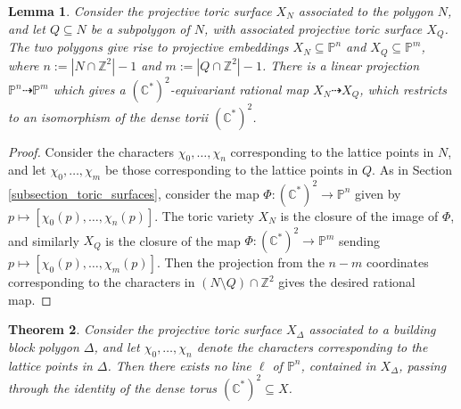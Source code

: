 \documentclass[11pt]{article} %
\newtheorem{theorem}{Theorem}[section]
\newtheorem{lemma}[theorem]{Lemma}
\theoremstyle{definition}
\newcommand{\Z}{{\mathbb Z}}
\newcommand{\C}{{\mathbb C}}
\begin{document}
 
 \begin{lemma}\label{lemma:taking:subpolygone:is:projection}
 Consider the projective toric surface $X_N$ associated to the polygon $N$, and let $Q\subseteq N$ be a subpolygon of $N$, with associated projective toric surface $X_Q$. The two polygons give rise to projective embeddings $X_N \subseteq \mathbb{P}^n$ and $X_Q \subseteq \mathbb{P}^m$, where $n:=|N \cap \Z^2|-1$ and $m:=|Q \cap \Z^2|-1$. There is a linear projection $\mathbb{P}^n \dashrightarrow \mathbb{P}^m$ which gives a $(\C^*)^2$-equivariant rational map $X_N \dashrightarrow X_Q$, which restricts to an isomorphism of the dense torii $(\C^*)^2$.
 \end{lemma}
 \begin{proof}
 Consider the characters $\chi_0,\dots,\chi_n$ corresponding to the lattice points in $N$, and let $\chi_0,\dots,\chi_m$ be those corresponding to the lattice points in $Q$. As in Section \ref{subsection_toric_surfaces}, consider the map $\Phi:(\C^*)^2\to \mathbb{P}^n$ given by $p\mapsto [\chi_0(p),\dots,\chi_n(p)]$. The toric variety $X_N$ is the closure of the image of $\Phi$, and similarly $X_Q$ is the closure of the map $\Phi:(\C^*)^2\to \mathbb{P}^m$ sending $p\mapsto [\chi_0(p),\dots,\chi_m(p)]$. Then the projection from the $n-m$ coordinates corresponding to the characters in $(N \setminus Q) \cap \Z^2$ gives the desired rational map.
 \end{proof}
\begin{theorem}\label{theorem:building:block:not:rbl}
Consider the projective toric surface $X_\Delta$ associated to a building block polygon $\Delta$, and let $\chi_0,\dots,\chi_n$ denote the characters corresponding to the lattice points in $\Delta$. Then there exists no line $\ell$ of $\mathbb{P}^n$, contained in $X_\Delta$, passing through the identity of the dense torus $(\C^*)^2\subseteq X$.
\end{theorem}
\end{document}
